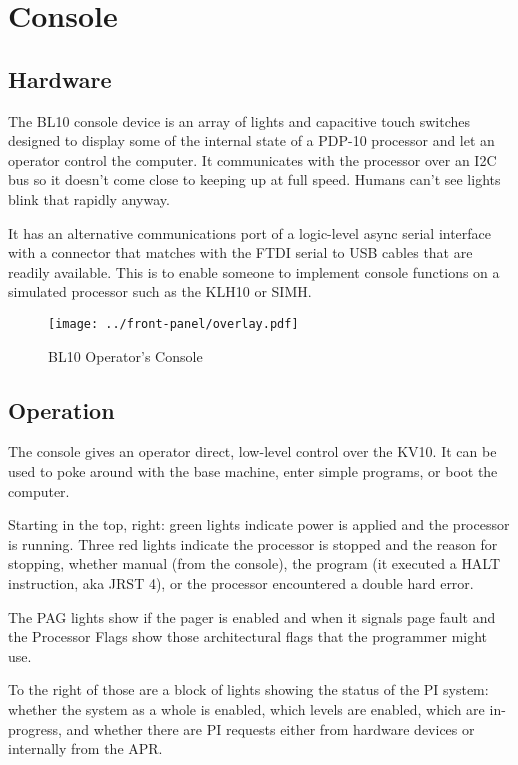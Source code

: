 \documentclass[12pt]{report}
\newcommand{\code}[1]{\textsf{#1}}
\begin{document}
\chapter{Console}

\section{Hardware}

The BL10 console device is an array of lights and capacitive touch switches designed to
display some of the internal state of a PDP-10 processor and let an operator control the
computer.  It communicates with the processor over an I2C bus so it doesn't come close to
keeping up at full speed.  Humans can't see lights blink that rapidly anyway.

It has an alternative communications port of a logic-level async serial interface with a
connector that matches with the FTDI serial to USB cables that are readily available.
This is to enable someone to implement console functions on a simulated processor such as
the KLH10 or SIMH.

\begin{figure}
\texttt{[image: ../front-panel/overlay.pdf]}
\caption{BL10 Operator's Console}
\end{figure}

\section{Operation}

The console gives an operator direct, low-level control over the KV10.  It can be used to
poke around with the base machine, enter simple programs, or boot the computer.

Starting in the top, right: green lights indicate power is applied and the processor is
running.  Three red lights indicate the processor is stopped and the reason for stopping,
whether manual (from the console), the program (it executed a \code{HALT} instruction,
aka \code{JRST 4}), or the processor encountered a double hard error.

The PAG lights show if the pager is enabled and when it signals page fault and the
Processor Flags show those architectural flags that the programmer might use.

To the right of those are a block of lights showing the status of the PI system: whether
the system as a whole is enabled, which levels are enabled, which are in-progress, and
whether there are PI requests either from hardware devices or internally from the APR.
\end{document}

